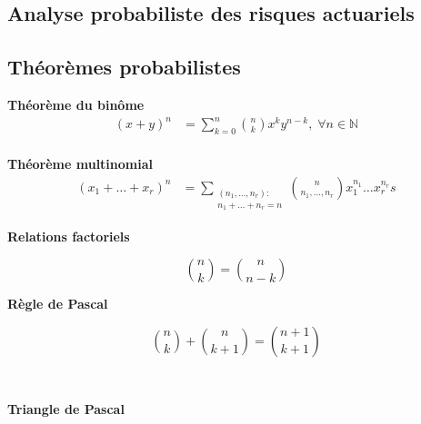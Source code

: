 \documentclass[10pt, french]{article}
\begin{document}
\begin{multicols*}{2}
\newpage

\section*{Analyse probabiliste des risques actuariels}

\subsection*{Théorèmes probabilistes}

\textbf{Théorème du binôme}
\begin{align*}
	(x + y)^{n}
		&=	\sum_{k = 0}^{n} \binom{n}{k} x^{k} y^{n - k}, \; \forall n \in \mathds{N}	\\
\end{align*}

%

\textbf{Théorème multinomial}
\begin{align*}
	(x_1 + \dots + x_r)^{n}
		&=	\sum_{\substack{(n_1, \dots, n_r): \\ n_1 + \dots + n_r = n}} \binom{n}{n_{1}, \dots, n_{r}} x_{1}^{n_{1}} \dots x_{r}^{n_{r}}	s
\end{align*}

\begin{minipage}[ht]{0.5\linewidth}
\textbf{Relations factoriels}

\begin{equation*}
	\binom{n}{k}
		=	\binom{n}{n - k}		
\end{equation*}
\end{minipage}
\begin{minipage}[ht]{0.5\linewidth}
\textbf{Règle de Pascal}

\begin{equation*}
	\binom{n}{k} + \binom{n}{k + 1}
		=	\binom{n + 1}{k + 1}		
\end{equation*}
\end{minipage}
\

\textbf{Triangle de Pascal}

\begin{minipage}{0.4\linewidth}


\end{minipage}
\end{multicols*}
\end{document}
